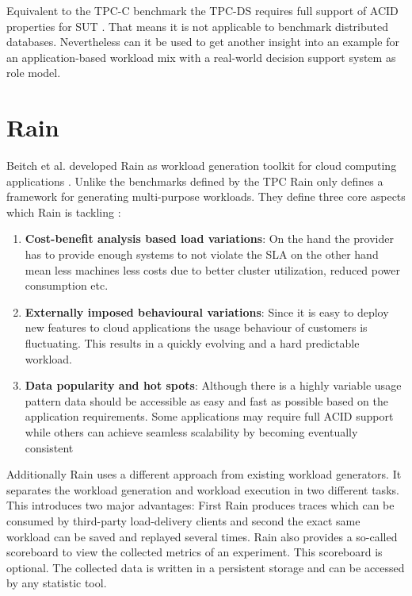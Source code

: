 Equivalent to the \ac{TPC}-C benchmark the \ac{TPC}-DS requires full support of ACID properties for \ac{SUT} \cite[72]{tpcds.2012}. That means it is not applicable to benchmark distributed databases. Nevertheless can it be used to get another insight into an example for an application-based workload mix with a real-world decision support system as role model.

\section{Rain}
\label{sec:rain}
Beitch et al. developed Rain as workload generation toolkit for cloud computing applications \cite{rain.2010}. Unlike the benchmarks defined by the \ac{TPC} Rain only defines a framework for generating multi-purpose workloads. They define three core aspects which Rain is tackling \cite[1 - 2]{rain.2010}:

\begin{enumerate}
  \item \textbf{Cost-benefit analysis based load variations}: On the hand the provider has to provide enough systems to not violate the \acf{SLA} on the other hand mean less machines less costs due to better cluster utilization, reduced power consumption etc.
  \item \textbf{Externally imposed behavioural variations}: Since it is easy to deploy new features to cloud applications the usage behaviour of customers is fluctuating. This results in a quickly evolving and a hard predictable workload.
  \item \textbf{Data popularity and hot spots}: Although there is a highly variable usage pattern data should be accessible as easy and fast as possible based on the application requirements. Some applications may require full ACID support while others can achieve seamless scalability by becoming eventually consistent
\end{enumerate}

Additionally Rain uses a different approach from existing workload generators. It separates the workload generation and workload execution in two different tasks. This introduces two major advantages: First Rain produces traces which can be consumed by third-party load-delivery clients and second the exact same workload can be saved and replayed several times. Rain also provides a so-called scoreboard to view the collected metrics of an experiment. This scoreboard is optional. The collected data is written in a persistent storage and can be accessed by any statistic tool. \cite[3 - 4]{rain.2010}


